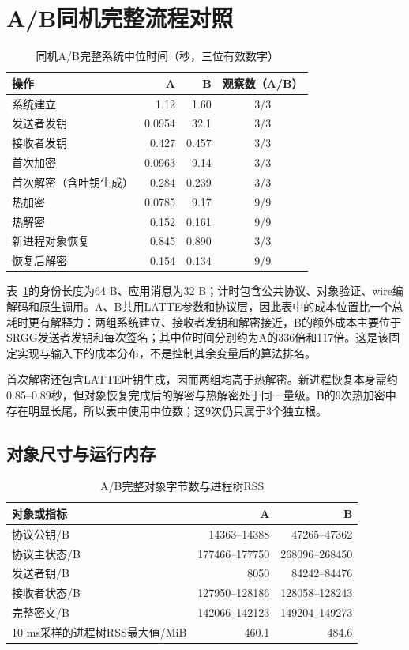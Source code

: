 \documentclass[UTF8,a4paper,12pt,oneside,openany,fontset=fandol]{ctexrep}
\begin{document}
\section{A/B同机完整流程对照}
\begin{table}[htbp]
\centering
\small
\caption{同机A/B完整系统中位时间（秒，三位有效数字）}
\label{tab:same-machine-ab-initial}
\begin{tabular}{@{}lrrc@{}}
\toprule
\rowcolor{black!8} 操作 & A & B & 观察数（A/B） \\
\midrule
系统建立 & 1.12 & 1.60 & 3/3 \\
发送者发钥 & 0.0954 & 32.1 & 3/3 \\
接收者发钥 & 0.427 & 0.457 & 3/3 \\
首次加密 & 0.0963 & 9.14 & 3/3 \\
首次解密（含叶钥生成） & 0.284 & 0.239 & 3/3 \\
热加密 & 0.0785 & 9.17 & 9/9 \\
热解密 & 0.152 & 0.161 & 9/9 \\
新进程对象恢复 & 0.845 & 0.890 & 3/3 \\
恢复后解密 & 0.154 & 0.134 & 9/9 \\
\bottomrule
\end{tabular}
\end{table}

表~\ref{tab:same-machine-ab-initial}的身份长度为64 B、应用消息为32 B；计时包含公共协议、对象验证、wire编解码和原生调用。A、B共用LATTE参数和协议层，因此表中的成本位置比一个总耗时更有解释力：两组系统建立、接收者发钥和解密接近，B的额外成本主要位于SRGG发送者发钥和每次签名；其中位时间分别约为A的336倍和117倍。这是该固定实现与输入下的成本分布，不是控制其余变量后的算法排名。

首次解密还包含LATTE叶钥生成，因而两组均高于热解密。新进程恢复本身需约0.85--0.89秒，但对象恢复完成后的解密与热解密处于同一量级。B的9次热加密中存在明显长尾，所以表中使用中位数；这9次仍只属于3个独立根。

\subsection{对象尺寸与运行内存}
\begin{table}[htbp]
\centering
\small
\caption{A/B完整对象字节数与进程树RSS}
\label{tab:ab-object-sizes}
\begin{tabular}{@{}lrr@{}}
\toprule
\rowcolor{black!8} 对象或指标 & A & B \\
\midrule
协议公钥/B & 14363--14388 & 47265--47362 \\
协议主状态/B & 177466--177750 & 268096--268450 \\
发送者钥/B & 8050 & 84242--84476 \\
接收者状态/B & 127950--128186 & 128058--128243 \\
完整密文/B & 142066--142123 & 149204--149273 \\
10 ms采样的进程树RSS最大值/MiB & 460.1 & 484.6 \\
\bottomrule
\end{tabular}
\end{table}
\end{document}
